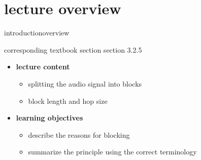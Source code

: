


\subtitle{module 3.2.5: fundamentals~---~blocking}


	

    \section[overview]{lecture overview}
        \begin{frame}{introduction}{overview}
            \begin{block}{corresponding textbook section}
                section 3.2.5
            \end{block}

            \begin{itemize}
                \item   \textbf{lecture content}
                    \begin{itemize}
                        \item   splitting the audio signal into blocks
                        \item   block length and hop size
                    \end{itemize}
                \bigskip
                \item<2->   \textbf{learning objectives}
                    \begin{itemize}
                        \item   describe the reasons for blocking
                        \item   summarize the principle using the correct terminology
                    \end{itemize}
            \end{itemize}
        \end{frame}

